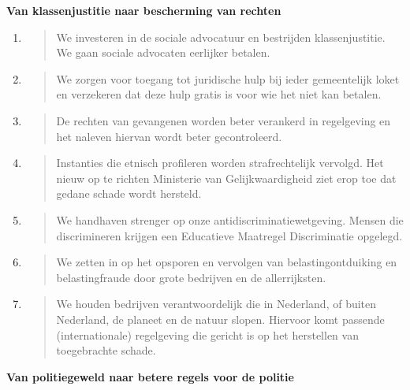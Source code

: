 \textbf{Van klassenjustitie naar bescherming van rechten}

\begin{enumerate}
\def\labelenumi{\arabic{enumi}.}
\item
  \begin{quote}
  We investeren in de sociale advocatuur en bestrijden klassenjustitie.
  We gaan sociale advocaten eerlijker betalen.
  \end{quote}
\item
  \begin{quote}
  We zorgen voor toegang tot juridische hulp bij ieder gemeentelijk
  loket en verzekeren dat deze hulp gratis is voor wie het niet kan
  betalen.
  \end{quote}
\item
  \begin{quote}
  De rechten van gevangenen worden beter verankerd in regelgeving en het
  naleven hiervan wordt beter gecontroleerd.
  \end{quote}
\item
  \begin{quote}
  Instanties die etnisch profileren worden strafrechtelijk vervolgd. Het
  nieuw op te richten Ministerie van Gelijkwaardigheid ziet erop toe dat
  gedane schade wordt hersteld.
  \end{quote}
\item
  \begin{quote}
  We handhaven strenger op onze antidiscriminatiewetgeving. Mensen die
  discrimineren krijgen een Educatieve Maatregel Discriminatie opgelegd.
  \end{quote}
\item
  \begin{quote}
  We zetten in op het opsporen en vervolgen van belastingontduiking en
  belastingfraude door grote bedrijven en de allerrijksten.
  \end{quote}
\item
  \begin{quote}
  We houden bedrijven verantwoordelijk die in Nederland, of buiten
  Nederland, de planeet en de natuur slopen. Hiervoor komt passende
  (internationale) regelgeving die gericht is op het herstellen van
  toegebrachte schade.
  \end{quote}
\end{enumerate}

\textbf{Van politiegeweld naar betere regels voor de politie}

